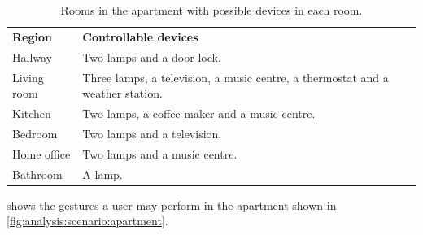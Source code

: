 \begin{table}[h!]
\centering
\caption{Rooms in the apartment with possible devices in each room.}
\label{tbl:analysis:scenario:rooms}
\begin{tabular}{ll}
\textbf{Region} & \textbf{Controllable devices}                                                 \\
Hallway         & Two lamps and a door lock.                                                    \\
Living room     & Three lamps, a television, a music centre, a thermostat and a weather station.\\
Kitchen         & Two lamps, a coffee maker and a music centre.                                 \\
Bedroom         & Two lamps and a television.                                                   \\
Home office     & Two lamps and a music centre.                                                 \\
Bathroom        & A lamp.                                                                      
\end{tabular}
\end{table}

 shows the gestures a user may perform in the apartment shown in \cref{fig:analysis:scenario:apartment}.

